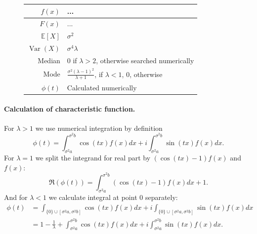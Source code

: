 \documentclass[a4paper,11pt]{article}
\theoremstyle{plain}
\theoremstyle{definition}
\newcommand{\ME}{\mathbb{E}}
\newcommand{\Var}{\operatorname{Var}}
\begin{document}
\begin{figure}[!htb]
\begin{minipage}{0.4\textwidth}
\begin{tabular}{| r | l |}
				\hline
				$f(x)$ & ...  \\
				\hline
				$F(x)$ & ... \\
				\hline
				$\ME[X]$ & $ \sigma^2 $ \\
				\hline
				$\Var(X)$ & $\sigma^4 \lambda $ \\
				\hline
				Median &
				\pbox{\linewidth}{$0$ if $\lambda > 2$, \\ otherwise searched numerically} \\
				\hline
				Mode & \pbox{\linewidth}{$\frac{\sigma^2(\lambda - 1)^2}{\lambda+1}$, if  $\lambda < 1$, \\  $ 0 $, otherwise } \\
				\hline
				$\phi(t)$ & Calculated numerically \\
				\hline
			\end{tabular}
		\end{minipage}
	\end{figure}
		
	\paragraph{Calculation of characteristic function.}
	For $\lambda > 1$ we use numerical integration by definition
	\[
	\phi(t) = \int_{\sigma^2 a}^{\sigma^2 b} \cos(tx) f(x) dx + i \int_{\sigma^2 a}^{\sigma^2 b}  \sin(tx) f(x) dx.
	\]
	For $\lambda = 1$ we split the integrand for real part by $(\cos(tx) - 1) f(x)$ and $f(x)$:
	\[ \Re(\phi(t)) =  \int_{\sigma^2 a}^{\sigma^2 b} (\cos(tx)-1) f(x) dx + 1.\]
	And for $\lambda < 1$ we calculate integral at point $0$ separately:
	\[
	\begin{aligned}
	\phi(t) & = \int_{ \{0\} \cup [\sigma^2 a, \sigma^2 b]} \cos(tx) f(x) dx + i \int_{ \{0\} \cup [\sigma^2 a, \sigma^2 b]} \sin(tx) f(x) dx  \\ 
	& = 1-\frac{1}{\lambda} + \int_{\sigma^2 a}^{\sigma^2 b} \cos(tx) f(x) dx + i \int_{\sigma^2 a}^{\sigma^2 b}  \sin(tx) f(x) dx.
	\end{aligned}
	\]
	
	
	\pagebreak
\end{document}
